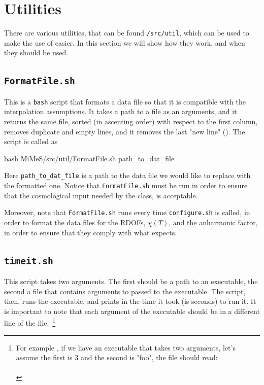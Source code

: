 \documentclass[11pt,a4paper]{article}
\begin{document}
\section{Utilities}\label{app:util}
\setcounter{equation}{0}
%
There are various utilities, that can be found {\tt \mimes/src/util}, which can be used to make the use of \mimes easier. In this section we will show how they work, and when they should be used.

\subsection{\tt FormatFile.sh} 
%
This is a {\tt bash} script that formats a data file so that it is compatible with the interpolation assumptions. It takes a path to a file as an arguments, and it returns the same file, sorted (in ascenting order) with respect to the first column, removes duplicate and empty lines, and it removes the last "new line" (\ie \cppin{\n}). The script is called as 
%
\begin{cpp}
	bash MiMeS/src/util/FormatFile.sh path_to_dat_file
\end{cpp}
%
Here {\tt path\_to\_dat\_file} is a path to the  data file we would like to replace with the formatted one. Notice that {\tt FormatFile.sh} must be run in order to ensure that the cosmological input needed by the  class, is acceptable.

Moreover, note that {\tt FormatFile.sh} runs every time {\tt configure.sh} is called, in order to format the data files for the RDOFs, $\chi(T)$, and the anharmonic factor, in order to ensure that they comply with what \mimes expects. 


\subsection{\tt timeit.sh}
%
This script takes two arguments. The first should be a path to an executable, the second a file that contains arguments to passed to the executable. The script, then, runs the executable, and prints in  the time it took (is seconds) to run it. It is important to note that each argument of the executable should be in a different line of the file.~\footnote{For example , if we have an executable that takes two arguments, let's assume the first is $3$ and the second is "foo", the file should read: \\
\\
}
\end{document}

